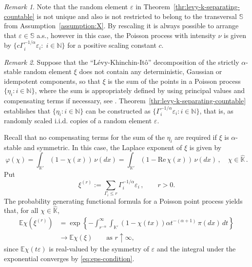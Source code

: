 \documentclass[12pt]{amsart}
\numberwithin{equation}{section}
\numberwithin{figure}{section}
\theoremstyle{plain} \newtheorem{theorem}{Theorem}[section]
\theoremstyle{plain} \newtheorem{proposition}[theorem]{Proposition}
\theoremstyle{plain} \newtheorem{lemma}[theorem]{Lemma}
\theoremstyle{plain} \newtheorem{corollary}[theorem]{Corollary}
\theoremstyle{definition} \newtheorem{definition}[theorem]{Definition}
\theoremstyle{definition} \newtheorem{notation}[theorem]{Notation}
\theoremstyle{remark} \newtheorem{remark}[theorem]{Remark}
\theoremstyle{remark} \newtheorem{example}[theorem]{Example}
\theoremstyle{definition} \newtheorem{assumption}{Assumption}
\newcommand{\bE}{\mathbb{E}}
\newcommand{\bK}{\mathbb{K}}
\newcommand{\bN}{\mathbb{N}}
\newcommand{\bS}{\mathbb{S}}
\newcommand{\bKH}{\hat{\bK}}
\renewcommand{\epsilon}{\varepsilon}
\newcommand{\eps}{\epsilon}
\renewcommand{\phi}{\varphi}
\renewcommand{\Re}{\mathrm{Re}\,}
\begin{document}
\begin{remark}
  Note that the random element $\eps$ in
  Theorem~\ref{thr:levy-k-separating-countable} is not unique and also
  is not restricted to belong to the transversal $\bS$ from
  Assumption~\ref{assumption:X}. By rescaling it is always possible to
  arrange that $\eps\in\bS$ a.s., however in this case, the Poisson
  process with intensity $\nu$ is given by
  $\{c\Gamma_i^{-1/\alpha}\eps_i:\; i\in\bN\}$ for a positive scaling
  constant $c$.
\end{remark}

\begin{remark}
  Suppose that the ``L\'evy-Khinchin-It\^o'' decomposition of the strictly
  $\alpha$-stable random element $\xi$ does not contain any deterministic, Gaussian
  or idempotent components, so that $\xi$ is the sum of the points in
  a Poisson process $\{\eta_i : i \in \bN\}$, where the sum is
  appropriately defined by using principal values and compensating
  terms if necessary, see \cite[Th.~7.2]{dav:mol:zuy08}.
  Theorem~\ref{thr:levy-k-separating-countable} establishes that
  $\{\eta_i : i \in \bN\}$ can be constructed as
  $\{\Gamma_i^{-1/\alpha}\eps_i: i \in \bN\}$, that is, as randomly
  scaled i.i.d. copies of a random element $\eps$.

  Recall that no compensating terms for the sum of the $\eta_i$ are
  required if $\xi$ is $\alpha$-stable and symmetric. In this case,
  the Laplace exponent of $\xi$ is given by
  \begin{displaymath}
    \phi(\chi) =\int_{\bK'}(1-\chi(x))\,\nu(dx)
    =\int_{\bK'}(1-\Re\chi(x))\,\nu(dx)\,,
    \quad \chi\in\bKH\,.
  \end{displaymath}
  Put
  \begin{equation}
    \label{eq:xi-r}
    \xi^{(r)} :=\sum_{\Gamma_i\leq r}
    \Gamma_i^{-1/\alpha}\eps_i\,,\qquad r>0.
  \end{equation}
  The probability generating functional formula for a Poisson point
  process yields that, for all $\chi\in\bKH$,
  \begin{align*}
    \bE \chi(\xi^{(r)}) 
    & =\exp\left\{-\int_{r^{-\alpha}}^\infty \int_{\bK'}
      (1-\chi(tx))\alpha t^{-(\alpha+1)} \,  \pi(dx) \, dt\right\}\\
    & \to \bE \chi(\xi)\qquad \text{as }
    r\uparrow\infty, 
  \end{align*}
  since $\bE\chi(t\eps)$ is real-valued by the symmetry of $\eps$ and
  the integral under the exponential converges by
  \eqref{eq:eps-condition}. 
\end{remark}
\end{document}
